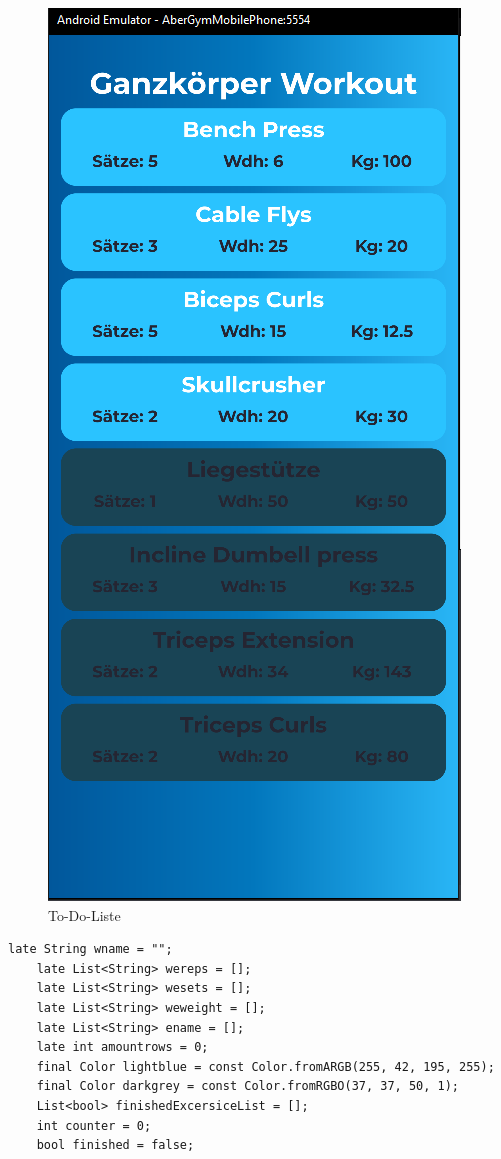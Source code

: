     \begin{figure}[H]
        \centering
        \includegraphics[scale=0.3]{pics/To-Do-Liste.png}
        \caption{To-Do-Liste}
    \end{figure}
    
    \pagebreak
    \begin{lstlisting}[caption=To-Do-Liste Trainingsplan Variablen,label=lst:impl:frontend:qrcode]
    late String wname = "";
    late List<String> wereps = [];
    late List<String> wesets = [];
    late List<String> weweight = [];
    late List<String> ename = [];
    late int amountrows = 0;
    final Color lightblue = const Color.fromARGB(255, 42, 195, 255);
    final Color darkgrey = const Color.fromRGBO(37, 37, 50, 1);
    List<bool> finishedExcersiceList = [];
    int counter = 0;
    bool finished = false;
    \end{lstlisting}
    
